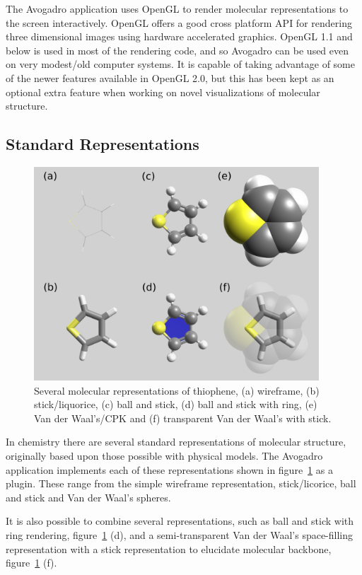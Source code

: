 \documentclass[10pt]{bmc_article}
\newenvironment{bmcformat}{\begin{raggedright}
\baselineskip20pt\sloppy\setboolean{publ}{false}}{\end{raggedright}
\baselineskip20pt\sloppy}
\begin{document}
\begin{bmcformat}
The Avogadro application uses OpenGL to render molecular representations to the
screen interactively. OpenGL offers a good cross platform API for rendering
three dimensional images using hardware accelerated graphics. OpenGL
1.1 and below is used in most of the rendering code, and so Avogadro can be used
even on very modest/old computer systems. It is capable of taking advantage of
some of the newer features available in OpenGL 2.0, but this has been kept as an
optional extra feature when working on novel visualizations of molecular
structure.

\subsection{Standard Representations}

\begin{figure}
  \includegraphics[width=0.95\textwidth]{images/standardRepsLabel}
  \caption{Several molecular representations of thiophene, (a) wireframe,
    (b) stick/liquorice, (c) ball and stick, (d) ball and stick with ring,
    (e) Van der Waal's/CPK and (f) transparent Van der Waal's with stick.}
  \label{f:standardReps}
\end{figure}

In chemistry there are several standard representations of molecular structure,
originally based upon those possible with physical models. The Avogadro
application implements each of these representations shown in
figure~\ref{f:standardReps} as a plugin. These range from the simple wireframe
representation, stick/licorice, ball and stick and Van der Waal's spheres.

It is also possible to combine several representations, such as ball and stick
with ring rendering, figure~\ref{f:standardReps} (d), and a semi-transparent Van
der Waal's space-filling representation with a stick representation to elucidate
molecular backbone, figure~\ref{f:standardReps} (f).


\end{bmcformat}
\end{document}
